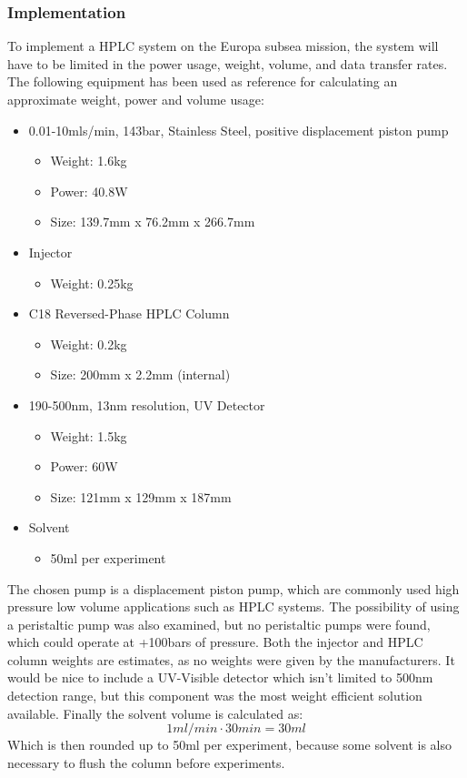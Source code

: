 \subsubsection{Implementation}
To implement a HPLC system on the Europa subsea mission, the system will have to be limited in the power usage, weight, volume, and data transfer rates. The following equipment has been used as reference for calculating an approximate weight, power and volume usage:
\begin{itemize}
    \item 0.01-10mls/min, 143bar, Stainless Steel, positive displacement piston pump \cite{hplc_motor}
    \begin{itemize}
        \item Weight: 1.6kg
        \item Power: 40.8W
        \item Size: 139.7mm x 76.2mm x 266.7mm
    \end{itemize}
    \item Injector \cite{hplc_injector}
    \begin{itemize}
        \item Weight: 0.25kg
    \end{itemize}
    \item C18 Reversed-Phase HPLC Column \cite{hplc_columns}
    \begin{itemize}
        \item Weight: 0.2kg
        \item Size: 200mm x 2.2mm (internal)
    \end{itemize}
    \item 190-500nm, 13nm resolution, UV Detector \cite{hplc_detector}
    \begin{itemize}
        \item Weight: 1.5kg
        \item Power: 60W
        \item Size: 121mm x 129mm x 187mm
    \end{itemize}
    \item Solvent
    \begin{itemize}
        \item 50ml per experiment
    \end{itemize}
\end{itemize}
The chosen pump is a displacement piston pump, which are commonly used high pressure low volume applications such as HPLC systems. The possibility of using a peristaltic pump was also examined, but no peristaltic pumps were found, which could operate at +100bars of pressure. Both the injector and HPLC column weights are estimates, as no weights were given by the manufacturers. It would be nice to include a UV-Visible detector which isn’t limited to 500nm detection range, but this component was the most weight efficient solution available. Finally the solvent volume is calculated as:
\begin{equation}
    1ml/min \cdot 30min = 30ml    
\end{equation}
Which is then rounded up to 50ml per experiment, because some solvent is also necessary to flush the column before experiments.

